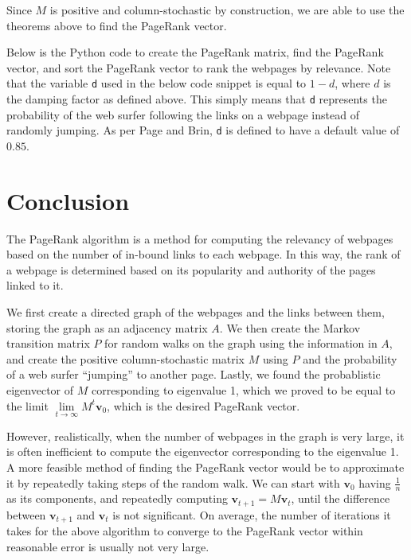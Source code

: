 \documentclass[11pt]{article}
\theoremstyle{definition}
\renewcommand{\vec}[1]{\mathbf{#1}}
\begin{document}
Since $M$ is positive and column-stochastic by construction, we are able to use the theorems above to find the PageRank vector.

Below is the Python code to create the PageRank matrix, find the PageRank vector, and sort the PageRank vector to rank the webpages by relevance.
Note that the variable \texttt{d} used in the below code snippet is equal to $1-d$, where $d$ is the damping factor as defined above.
This simply means that \texttt{d} represents the probability of the web surfer following the links on a webpage instead of randomly jumping.
As per Page and Brin, \texttt{d} is defined to have a default value of $0.85$.




\section{Conclusion}
The PageRank algorithm is a method for computing the relevancy of webpages based on the number of in-bound links to each webpage.
In this way, the rank of a webpage is determined based on its popularity and authority of the pages linked to it.

We first create a directed graph of the webpages and the links between them, storing the graph as an adjacency matrix $A$.
We then create the Markov transition matrix $P$ for random walks on the graph using the information in $A$,
and create the positive column-stochastic matrix $M$ using $P$ and the probability of a web surfer ``jumping'' to another page.
Lastly, we found the probablistic eigenvector of $M$ corresponding to eigenvalue 1, which we proved to be equal to the limit $\lim\limits_{t\to \infty}{M^t \vec{v}_0}$, which is the desired PageRank vector.

However, realistically, when the number of webpages in the graph is very large, it is often inefficient to compute the eigenvector corresponding to the eigenvalue 1.
A more feasible method of finding the PageRank vector would be to approximate it by repeatedly taking steps of the random walk.
We can start with $\vec{v}_0$ having $\frac1n$ as its components, and repeatedly computing $\vec{v}_{t+1} = M \vec{v}_t$, until the difference between $\vec{v}_{t+1}$ and $\vec{v}_t$ is not significant.
On average, the number of iterations it takes for the above algorithm to converge to the PageRank vector within reasonable error is usually not very large.
\end{document}
